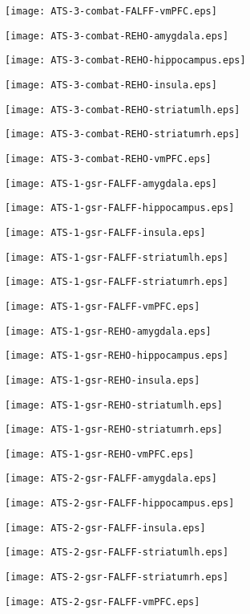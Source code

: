 \documentclass{article}
\begin{document}
\newpage
\texttt{[image: ATS-3-combat-FALFF-vmPFC.eps]}

\newpage
\texttt{[image: ATS-3-combat-REHO-amygdala.eps]}

\newpage
\texttt{[image: ATS-3-combat-REHO-hippocampus.eps]}

\newpage
\texttt{[image: ATS-3-combat-REHO-insula.eps]}

\newpage
\texttt{[image: ATS-3-combat-REHO-striatumlh.eps]}

\newpage
\texttt{[image: ATS-3-combat-REHO-striatumrh.eps]}

\newpage
\texttt{[image: ATS-3-combat-REHO-vmPFC.eps]}

\newpage
\texttt{[image: ATS-1-gsr-FALFF-amygdala.eps]}

\newpage
\texttt{[image: ATS-1-gsr-FALFF-hippocampus.eps]}

\newpage
\texttt{[image: ATS-1-gsr-FALFF-insula.eps]}

\newpage
\texttt{[image: ATS-1-gsr-FALFF-striatumlh.eps]}

\newpage
\texttt{[image: ATS-1-gsr-FALFF-striatumrh.eps]}

\newpage
\texttt{[image: ATS-1-gsr-FALFF-vmPFC.eps]}

\newpage
\texttt{[image: ATS-1-gsr-REHO-amygdala.eps]}

\newpage
\texttt{[image: ATS-1-gsr-REHO-hippocampus.eps]}

\newpage
\texttt{[image: ATS-1-gsr-REHO-insula.eps]}

\newpage
\texttt{[image: ATS-1-gsr-REHO-striatumlh.eps]}

\newpage
\texttt{[image: ATS-1-gsr-REHO-striatumrh.eps]}

\newpage
\texttt{[image: ATS-1-gsr-REHO-vmPFC.eps]}

\newpage
\texttt{[image: ATS-2-gsr-FALFF-amygdala.eps]}

\newpage
\texttt{[image: ATS-2-gsr-FALFF-hippocampus.eps]}

\newpage
\texttt{[image: ATS-2-gsr-FALFF-insula.eps]}

\newpage
\texttt{[image: ATS-2-gsr-FALFF-striatumlh.eps]}

\newpage
\texttt{[image: ATS-2-gsr-FALFF-striatumrh.eps]}

\newpage
\texttt{[image: ATS-2-gsr-FALFF-vmPFC.eps]}
\end{document}
